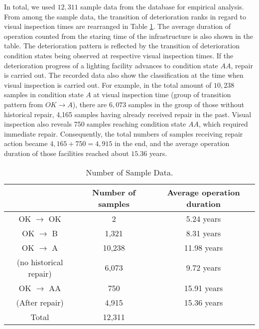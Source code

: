 In total, we used $12,311$ sample data from the database for empirical analysis. From among the sample data, the transition of deterioration ranks in regard to visual inspection times are rearranged in Table \ref{table32}. The average duration of operation counted from the staring time of the infrastructure is also shown in the table. The deterioration pattern is reflected by the transition of deterioration condition states being observed at respective visual inspection times. If the deterioration progress of a lighting facility advances to condition state $AA$, repair is carried out. The recorded data also show the classification at the time when visual inspection is carried out. For example, in the total amount of $10,238$ samples in condition state $A$ at visual inspection time (group of transition pattern from $OK \rightarrow A$), there are $6,073$ samples in the group of those without historical repair, 4,165 samples having already received repair in the past. Visual inspection also reveals 750 samples reaching condition state $AA$, which required immediate repair. Consequently, the total numbers of samples receiving repair action became  $4,165+750=4,915$ in the end, and the average operation duration of those facilities reached about $15.36$ years. 
 
\begin{table}[t]
\caption{Number of Sample Data.}
\label{table32}
{\small
\begin{center}
\begin{tabular}{c|c|c}
 & Number of samples & Average operation duration \\\hline
OK $\rightarrow$ OK & 2 & 5.24 years \\\hline
OK $\rightarrow$ B & 1,321 & 8.31 years \\\hline
OK $\rightarrow$ A & 10,238  & 11.98 years \\\cline{2-3}
(no historical repair) & 6,073 & 9.72 years \\\hline
OK $\rightarrow$ AA & 750 & 15.91 years \\\cline{2-3}
(After repair) & 4,915 & 15.36 years \\\hline
Total & 12,311 & \\\hline
\end{tabular}
\end{center}
}
\end{table}%
